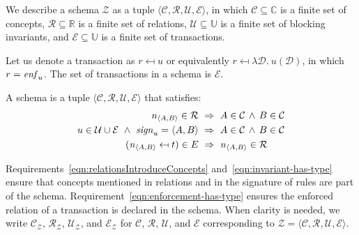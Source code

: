 \documentclass[runningheads]{llncs}
\newcommand{\id}[1]{\text{\it #1\/}}
\newcommand{\sign}[1]{\id{sign}_{#1}}
\newcommand{\enfRel}[1]{\id{enf}_{#1}}
\newcommand{\declare}[3]{\id{#1}_{\pair{#2}{#3}}}
\newcommand{\pair}[2]{\langle{#1},{#2}\rangle}
\newcommand{\quadruple}[4]{\langle{#1},{#2},{#3},{#4}\rangle}
\newcommand{\concepts}{\mathcal{C}}
\newcommand{\Concepts}{\mathbb{C}}
\newcommand{\rels}{\mathcal{R}}   %
\newcommand{\Rels}{\mathbb{R}}   %
\newcommand{\transactions}{\mathcal{E}}
\newcommand{\rules}{\mathcal{U}}
\newcommand{\Constraints}{\mathbb{U}}
\newcommand{\dataset}{\mathscr{D}}
\newcommand{\schema}{\mathscr{Z}}
\begin{document}
   We describe a schema $\schema$ as a tuple $\quadruple{\concepts}{\rels}{\rules}{\transactions}$,
   in which $\concepts\subseteq \Concepts$ is a finite set of concepts,
   $\rels\subseteq\Rels$ is a finite set of relations,
   $\rules\subseteq\Constraints$ is a finite set of blocking invariants,
   and $\transactions\subseteq\Constraints$ is a finite set of transactions.
   
   Let us denote a transaction as $r \mapsfrom u$ or equivalently $r \mapsfrom \lambda \dataset.~ u(\dataset)$,
   in which $r=\enfRel{u}$.
   The set of transactions in a schema is $\transactions$.
   
   \begin{definition}[Schema]
   A schema is a tuple $\quadruple{\concepts}{\rels}{\rules}{\transactions}$ that satisfies:
\begin{align}
   \declare{n}{A}{B}\in\rels&~\Rightarrow~ A\in\concepts\,\wedge\, B\in\concepts
   \label{eqn:relationsIntroduceConcepts}\\
   u\in\rules\cup\transactions\ \wedge\ \sign{u}=\pair{A}{B}&~\Rightarrow~A\in\concepts\,\wedge\, B\in\concepts\label{eqn:invariant-has-type}\\
   (\declare{n}{A}{B}\mapsfrom t)\in\mathcal\transactions&~\Rightarrow~ \declare{n}{A}{B}\in \rels\label{eqn:enforcement-has-type}
\end{align}
   \end{definition}
   Requirements~\ref{eqn:relationsIntroduceConcepts} and~\ref{eqn:invariant-has-type} ensure that concepts mentioned in relations and in the signature of rules are part of the schema.
   Requirement~\ref{eqn:enforcement-has-type} ensures the enforced relation of a transaction is declared in the schema. 
   When clarity is needed, we write $\concepts_{\schema}$, $\rels_{\schema}$, $\rules_{\schema}$, and $\transactions_{\schema}$
   for $\concepts$, $\rels$, $\rules$, and $\transactions$ corresponding to $\schema = \quadruple{\concepts}{\rels}{\rules}{\transactions}$.
\end{document}
